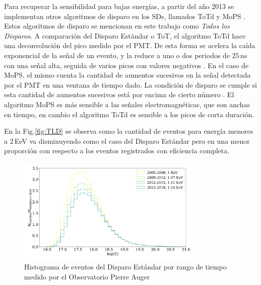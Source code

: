 Para recuperar la sensibilidad para bajas energías, a partir del año 2013  se implementan otros algoritmos de disparo en los SDs, llamados ToTd y MoPS \cite{pierre2013plans}. Estos algoritmos de disparo se mencionan en este trabajo como \textit{Todos los Disparos}. A comparación del Disparo Estándar o ToT, el algoritmo ToTd hace una deconvolución del pico medido por el PMT. De esta forma se acelera la caída exponencial de la señal de un evento, y la reduce a uno o dos periodos de  $25\,$ns con una señal alta, seguida de varios picos con valores negativos \cite{ToTd}. En el caso de MoPS, el mismo cuenta la  cantidad de aumentos sucesivos en la señal detectada por el PMT en una ventana de tiempo dado. La condición de disparo se cumple si esta cantidad de aumentos sucesivos está por encima de cierto número \cite{MoPS}. El algoritmo MoPS es más sensible a las señales electromagnéticas, que son anchas en tiempo, en cambio el algoritmo ToTd es sensible a los picos de corta duración.  


En la Fig.\ref{fig:TLD} se observa como la cantidad de eventos para energía menores a $2\,$EeV va disminuyendo como el caso del Disparo Estándar pero en una menor proporción con respecto a los eventos registrados con eficiencia completa.


\begin{figure}[H]
	\centering
	\includegraphics[width=0.8\textwidth]{histograma_Standard.pdf}
	\caption{Histograma de eventos  del Disparo Estándar por rango de tiempo medido por el Observatorio Pierre Auger}
	\label{fig:futuro}
\end{figure}


